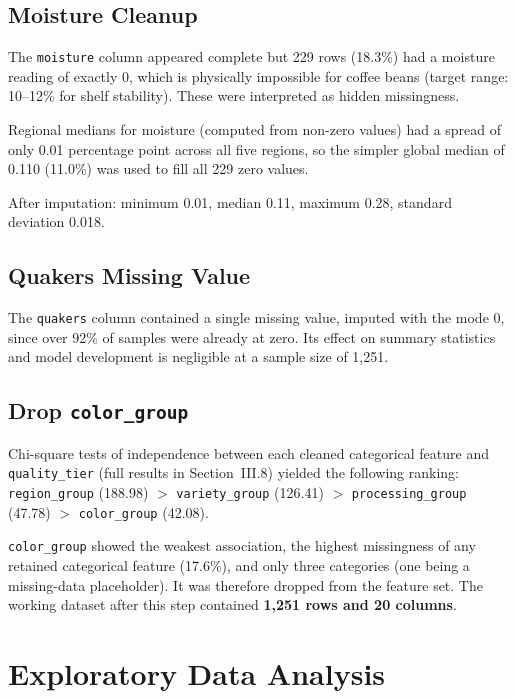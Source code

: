 \documentclass[12pt, a4paper]{article}
\begin{document}
\subsection{Moisture Cleanup}

The \texttt{moisture} column appeared complete but 229 rows (18.3\%) had a moisture reading of
exactly 0, which is physically impossible for coffee beans (target range: 10--12\% for shelf
stability). These were interpreted as hidden missingness.

Regional medians for moisture (computed from non-zero values) had a spread of only 0.01
percentage point across all five regions, so the simpler global median of 0.110 (11.0\%) was used
to fill all 229 zero values.

After imputation: minimum 0.01, median 0.11, maximum 0.28, standard deviation 0.018.

\subsection{Quakers Missing Value}

The \texttt{quakers} column contained a single missing value, imputed with the mode 0, since
over 92\% of samples were already at zero. Its effect on summary statistics and model development
is negligible at a sample size of 1,251.

\subsection{Drop \texttt{color\_group}}

Chi-square tests of independence between each cleaned categorical feature and
\texttt{quality\_tier} (full results in Section~III.8) yielded the following ranking:
\texttt{region\_group} (188.98) $>$ \texttt{variety\_group} (126.41) $>$
\texttt{processing\_group} (47.78) $>$ \texttt{color\_group} (42.08).

\texttt{color\_group} showed the weakest association, the highest missingness of any retained
categorical feature (17.6\%), and only three categories (one being a missing-data placeholder).
It was therefore dropped from the feature set. The working dataset after this step contained
\textbf{1,251 rows and 20 columns}.

\section{Exploratory Data Analysis}
\end{document}
